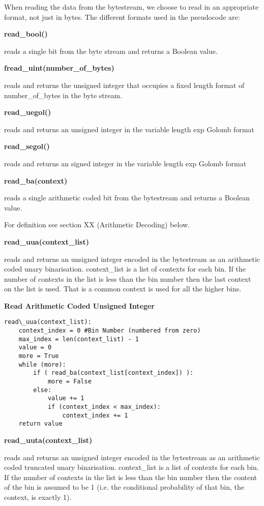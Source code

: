 When reading the data from the bytestream, we choose to read in an
appropriate format, not just in bytes. The different formats used in the
pseudocode are:

\textbf{read\_bool()}

reads a single bit from the byte stream and returns a Boolean value.

\textbf{fread\_uint(number\_of\_bytes)}

reads and returns the unsigned integer that occupies a fixed length
format of number\_of\_bytes in the byte stream.

\textbf{read\_uegol()}

reads and returns an unsigned integer in the variable length exp Golomb
format

\textbf{read\_segol()}

reads and returns an signed integer in the variable length exp Golomb
format

\textbf{read\_ba(context)}

reads a single arithmetic coded bit from the bytestream and returns a
Boolean value.

For definition see section XX (Arithmetic Decoding) below.

\textbf{read\_uua(context\_list)}

reads and returns an unsigned integer encoded in the bytestream as an
arithmetic coded unary binarisation. context\_list is a list of contexts
for each bin. If the number of contexts in the list is less than the bin
number then the last context on the list is used. That is a common
context is used for all the higher bins.

\textbf{Read Arithmetic Coded Unsigned Integer }

\begin{verbatim}
read\_uua(context_list):
    context_index = 0 #Bin Number (numbered from zero)
    max_index = len(context_list) - 1
    value = 0
    more = True
    while (more):
        if ( read_ba(context_list[context_index]) ):
            more = False
        else:
            value += 1
            if (context_index < max_index):
                context_index += 1
    return value
\end{verbatim}

\textbf{read\_uuta(context\_list)}

reads and returns an unsigned integer encoded in the bytestream as an
arithmetic coded truncated unary binarisation. context\_list is a list
of contexts for each bin. If the number of contexts in the list is less
than the bin number then the content of the bin is assumed to be 1 (i.e.
the conditional probability of that bin, the context, is exactly 1).

